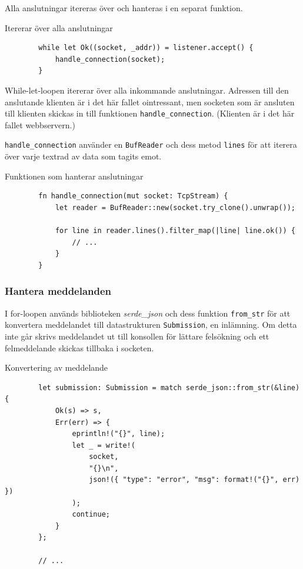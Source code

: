 \documentclass{article}
\begin{document}
Alla anslutningar itereras över och hanteras i en separat funktion.

\begin{listing}[H]
	\caption{Itererar över alla anslutningar}
	\begin{verbatim}
		while let Ok((socket, _addr)) = listener.accept() {
			handle_connection(socket);
		}
	\end{verbatim}
\end{listing}

While-let-loopen itererar över alla inkommande anslutningar.  Adressen till den
anslutande klienten är i det här fallet ointressant, men socketen som är
ansluten till klienten skickas in till funktionen \texttt{handle\_connection}.
(Klienten är i det här fallet webbservern.)

\texttt{handle\_connection} använder en \texttt{BufReader} och dess metod
\texttt{lines} för att iterera över varje textrad av data som tagits emot.

\begin{listing}[H]
	\caption{Funktionen som hanterar anslutningar}
	\begin{verbatim}
		fn handle_connection(mut socket: TcpStream) {
			let reader = BufReader::new(socket.try_clone().unwrap());

			for line in reader.lines().filter_map(|line| line.ok()) {
				// ...
			}
		}
	\end{verbatim}
\end{listing}

\subsubsection{Hantera meddelanden}

I for-loopen används biblioteken \textit{serde\_json} och dess funktion
\texttt{from\_str} för att konvertera meddelandet till datastrukturen
\texttt{Submission}, en inlämning. Om detta inte går skrivs meddelandet ut till
konsollen för lättare felsökning och ett felmeddelande skickas tillbaka i
socketen.

\begin{listing}[H]
	\caption{Konvertering av meddelande}
	\begin{verbatim}
		let submission: Submission = match serde_json::from_str(&line) {
			Ok(s) => s,
			Err(err) => {
				eprintln!("{}", line);
				let _ = write!(
					socket,
					"{}\n",
					json!({ "type": "error", "msg": format!("{}", err) })
				);
				continue;
			}
		};

		// ...
	\end{verbatim}
\end{listing}
\end{document}
